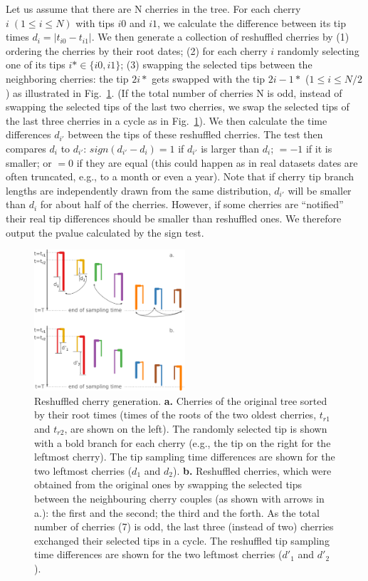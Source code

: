 \documentclass[10pt,letterpaper]{article}
\begin{document}
Let us assume that there are N cherries in the tree. For each cherry $i\;(1 \leq i \leq N)$ with tips $i0$ and $i1$, we calculate the difference between its tip times $d_i = |t_{i0} - t_{i1}|$. We then generate a collection of reshuffled cherries by (1) ordering the cherries by their root dates; (2) for each cherry $i$ randomly selecting one of its tips $i* \in \{i0, i1\}$; (3) swapping the selected tips between the neighboring cherries: the tip $2i*$ gets swapped with the tip $2i-1*$ ($1 \leq i \leq N / 2$) as illustrated in Fig.~\ref{fig:tipswap}. (If the total number of cherries N is odd, instead of swapping the selected tips of the last two cherries, we swap the selected tips of the last three cherries in a cycle as in Fig.~\ref{fig:tipswap}). We then calculate the time differences $d_{i'}$ between the tips of these reshuffled cherries. 
The test then compares $d_i$ to $d_{i'}$: $sign(d_{i'} - d_i) = 1$ if $d_{i'}$ is larger than $d_i$; $= -1$ if it is smaller; or $= 0$ if they are equal (this could happen as in real datasets dates are often truncated, e.g., to a month or even a year). Note that if cherry tip branch lengths are independently drawn from the same distribution, $d_{i'}$ will be smaller than $d_i$ for about half of the cherries. However, if some cherries are ``notified'' their real tip differences should be smaller than reshuffled ones. We therefore output the pvalue calculated by the sign test.


\begin{figure}[tbhp]
\centering 
\includegraphics[width=0.5\textwidth]{Fig_cherryswap.png}
\caption{Reshuffled cherry generation. \textbf{a.} Cherries of the original tree sorted by their root times (times of the roots of the two oldest cherries, $t_{r1}$ and $t_{r2}$, are shown on the left). The randomly selected tip is shown with a bold branch for each cherry (e.g., the tip on the right for the leftmost cherry). The tip sampling time differences are shown for the two leftmost cherries ($d_1$ and $d_2$). \textbf{b.} Reshuffled cherries, which were obtained from the original ones by swapping the selected tips between the neighbouring cherry couples (as shown with arrows in a.): the first and the second; the third and the forth. As the total number of cherries (7) is odd, the last three (instead of two) cherries exchanged their selected tips in a cycle. The reshuffled tip sampling time differences are shown for the two leftmost cherries ($d'_1$ and $d'_2$).}
\label{fig:tipswap} 
\end{figure}
\end{document}
